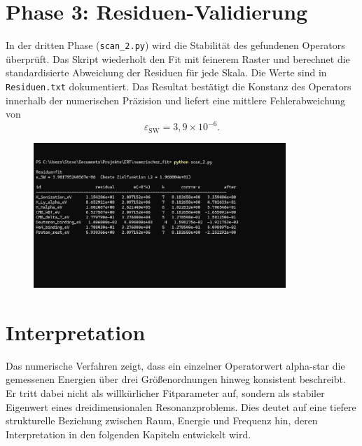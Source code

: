 \newpage
\section{Phase 3: Residuen-Validierung}

In der dritten Phase (\texttt{scan\_2.py}) wird die Stabilität des gefundenen
Operators überprüft. Das Skript wiederholt den Fit mit feinerem Raster und
berechnet die standardisierte Abweichung der Residuen für jede Skala.
Die Werte sind in \texttt{Residuen.txt} dokumentiert.
Das Resultat bestätigt die Konstanz des Operators innerhalb der numerischen
Präzision und liefert eine mittlere Fehlerabweichung von
\[
  \varepsilon_{\mathrm{SW}} = 3{,}9\times10^{-6}.
\]

\begin{figure}
  \centering
  \includegraphics[width=0.85\textwidth]{Grafiken/03_numerischer_scan_fit/scan2.jpg}
  \label{fig:scan2}
\end{figure}

\section{Interpretation}

Das numerische Verfahren zeigt, dass ein einzelner Operatorwert
\gls{alpha-star} die gemessenen Energien über drei Größenordnungen hinweg
konsistent beschreibt.  
Er tritt dabei nicht als willkürlicher Fitparameter auf, sondern als stabiler
Eigenwert eines dreidimensionalen Resonanzproblems.
Dies deutet auf eine tiefere strukturelle Beziehung zwischen
Raum, Energie und Frequenz hin, deren Interpretation
in den folgenden Kapiteln entwickelt wird.
